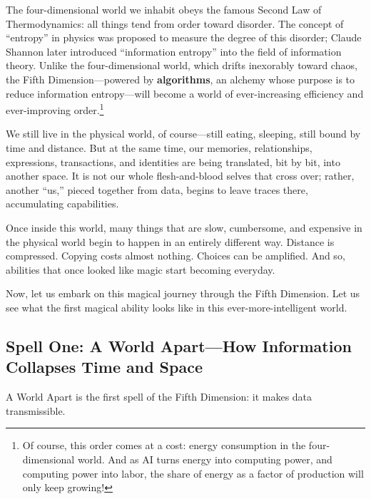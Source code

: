 The four-dimensional world we inhabit obeys the famous Second Law of Thermodynamics: all things tend from order toward disorder. The concept of ``entropy'' in physics was proposed to measure the degree of this disorder; Claude Shannon later introduced ``information entropy'' into the field of information theory. Unlike the four-dimensional world, which drifts inexorably toward chaos, the Fifth Dimension---powered by \textbf{algorithms}, an alchemy whose purpose is to reduce information entropy---will become a world of ever-increasing efficiency and ever-improving order.\footnote{Of course, this order comes at a cost: energy consumption in the four-dimensional world. And as AI turns energy into computing power, and computing power into labor, the share of energy as a factor of production will only keep growing!}

\vspace{1em}

We still live in the physical world, of course---still eating, sleeping, still bound by time and distance. But at the same time, our memories, relationships, expressions, transactions, and identities are being translated, bit by bit, into another space. It is not our whole flesh-and-blood selves that cross over; rather, another ``us,'' pieced together from data, begins to leave traces there, accumulating capabilities.

\vspace{1em}

Once inside this world, many things that are slow, cumbersome, and expensive in the physical world begin to happen in an entirely different way. Distance is compressed. Copying costs almost nothing. Choices can be amplified. And so, abilities that once looked like magic start becoming everyday.



Now, let us embark on this magical journey through the Fifth Dimension. Let us see what the first magical ability looks like in this ever-more-intelligent world.

\newpage
\subsection{Spell One: A World Apart---How Information Collapses Time and Space}

A World Apart is the first spell of the Fifth Dimension: it makes data transmissible.

